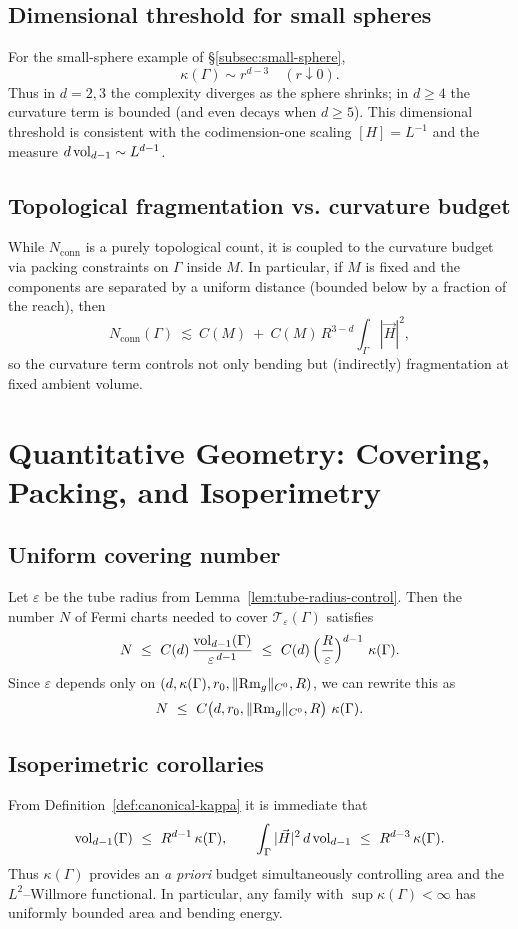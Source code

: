 \subsection{Dimensional threshold for small spheres}
For the small-sphere example of \S\ref{subsec:small-sphere},
\[
\kappa(\Gamma)\sim r^{d-3}\quad(r\downarrow 0).
\]
Thus in $d=2,3$ the complexity diverges as the sphere shrinks;
in $d\ge 4$ the curvature term is bounded (and even decays when $d\ge 5$). This dimensional threshold
is consistent with the codimension-one scaling $[H]=L^{-1}$ and the measure $d\operatorname{vol}_{d-1}\sim L^{d-1}$.

\subsection{Topological fragmentation vs. curvature budget}
While $N_{\mathrm{conn}}$ is a purely topological count, it is coupled to the curvature budget via
packing constraints on $\Gamma$ inside $M$. In particular, if $M$ is fixed and the components are separated
by a uniform distance (bounded below by a fraction of the reach), then
\[
N_{\mathrm{conn}}(\Gamma)\ \lesssim\ C(M)\ +\ C(M)\,R^{3-d}\int_\Gamma |\vec H|^2,
\]
so the curvature term controls not only bending but (indirectly) fragmentation at fixed ambient volume.

\section{Quantitative Geometry: Covering, Packing, and Isoperimetry}
\label{sec:isoperimetric}

\subsection{Uniform covering number}
Let $\varepsilon$ be the tube radius from Lemma~\ref{lem:tube-radius-control}. Then the number $N$ of Fermi charts needed to cover $\mathcal{T}_\varepsilon(\Gamma)$ satisfies
\[
N\ \le\ C(d)\,\frac{\vol_{d-1}(\Gamma)}{\varepsilon^{\,d-1}}\ \le\ C(d)\,\Big(\frac{R}{\varepsilon}\Big)^{d-1}\ \kappa(\Gamma).
\]
Since $\varepsilon$ depends only on $(d,\kappa(\Gamma),r_0,\|{\rm Rm}_g\|_{C^0},R)$, we can rewrite this as
\[
N\ \le\ C\big(d,r_0,\|{\rm Rm}_g\|_{C^0},R\big)\ \kappa(\Gamma).
\]

\subsection{Isoperimetric corollaries}
From Definition~\ref{def:canonical-kappa} it is immediate that
\[
\vol_{d-1}(\Gamma)\ \le\ R^{d-1}\,\kappa(\Gamma),\qquad
\int_\Gamma |\vec H|^2\,d\vol_{d-1}\ \le\ R^{d-3}\,\kappa(\Gamma).
\]
Thus $\kappa(\Gamma)$ provides an \emph{a priori} budget simultaneously controlling area and the $L^2$–Willmore functional.
In particular, any family with $\sup \kappa(\Gamma)<\infty$ has uniformly bounded area and bending energy.

